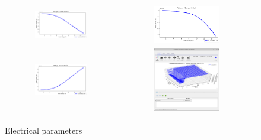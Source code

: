 \begin{figure}[H]
\centering
\begin{tabular}{ c c }

\includegraphics[width=0.5\textwidth,height=0.4\textwidth]{./images/ofet_7.png}

&
\includegraphics[width=0.5\textwidth,height=0.4\textwidth]{./images/ofet_8.png}
\\

\includegraphics[width=0.5\textwidth,height=0.4\textwidth]{./images/ofet_9.png}

&
\includegraphics[width=0.5\textwidth,height=0.4\textwidth]{./images/ofet_10.png}
\\
\end{tabular}
\caption{Electrical parameters}
\end{figure}

